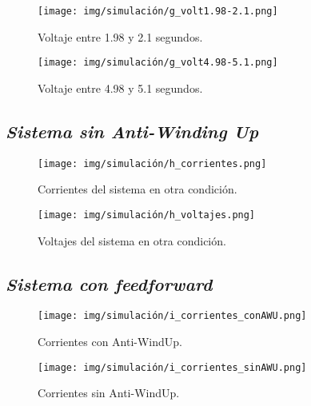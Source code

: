 

\begin{figure}[H]
    \centering
    \texttt{[image: img/simulación/g\_volt1.98-2.1.png]}
    \caption{Voltaje entre 1.98 y 2.1 segundos.}
    \label{fig:g_volt1.98-2.1}
\end{figure}

\begin{figure}[H]
    \centering
    \texttt{[image: img/simulación/g\_volt4.98-5.1.png]}
    \caption{Voltaje entre 4.98 y 5.1 segundos.}
    \label{fig:g_volt4.98-5.1}
\end{figure}

\subsection{\textit{Sistema sin Anti-Winding Up}}

\begin{figure}[H]
    \centering
    \texttt{[image: img/simulación/h\_corrientes.png]}
    \caption{Corrientes del sistema en otra condición.}
    \label{fig:h_corrientes}
\end{figure}

\begin{figure}[H]
    \centering
    \texttt{[image: img/simulación/h\_voltajes.png]}
    \caption{Voltajes del sistema en otra condición.}
    \label{fig:h_voltajes}
\end{figure}

\subsection{\textit{Sistema con feedforward}}

\begin{figure}[H]
    \centering
    \texttt{[image: img/simulación/i\_corrientes\_conAWU.png]}
    \caption{Corrientes con Anti-WindUp.}
    \label{fig:i_corrientes_conAWU}
\end{figure}

\begin{figure}[H]
    \centering
    \texttt{[image: img/simulación/i\_corrientes\_sinAWU.png]}
    \caption{Corrientes sin Anti-WindUp.}
    \label{fig:i_corrientes_sinAWU}
\end{figure}

